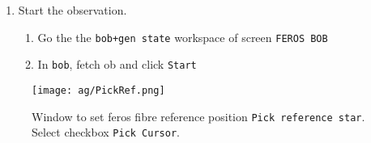 \documentclass[11pt,fleqn]{book} %
\begin{document}
\begin{enumerate}
\begin{enumerate}
\begin{enumerate}
            If checkbox \texttt{Camera On/Off} is not green, click on it.
      \item Ensure autoguider refreshes image\\
            On the \texttt{Autoguider control} the checkbox  should be red
      \item Ensure the image is horizontally flipped.\\
            Right of scale the button $\leftrightarrow$ should be pressed.
    \end{enumerate}
    \item Set the fibre reference position if GROND was used
    \begin{enumerate}
      \item Open or activate window \texttt{Pick reference star} (Fig.~\ref{fig:pickref}).\\
            Click \texttt{Set Reference} on window  \texttt{E2P2 Real Time Display}.
      \item Ensure the reference is set on the cursor's clicking position.\\
            On window \texttt{Pick reference star}, select checkbox \texttt{Pick Cursor}.
      \item Back on window \texttt{E2P2 Real Time Display}, click on fibre position.\\
            Coordinates are x=822 and y=516, zooming to 3 or 4$\times$ helps to click accurately.\\
            A box centred on the pixel should appear.
    \end{enumerate}
  \end{enumerate}
  \item Start the observation.
  \begin{enumerate}
    \item Go the the \texttt{bob+gen state} workspace of screen \texttt{FEROS BOB}
    \item In \texttt{bob}, fetch \gls{ob} and click \texttt{Start}
  \end{enumerate}
\end{enumerate}

\begin{figure}[!ht]
\centering
\texttt{[image: ag/PickRef.png]}
\caption[Window to set FEROS fibre reference position]{Window to set \gls{feros} fibre reference position \texttt{Pick reference star}. Select checkbox \texttt{Pick Cursor}.}
\label{fig:pickref}
\end{figure}
\end{document}
